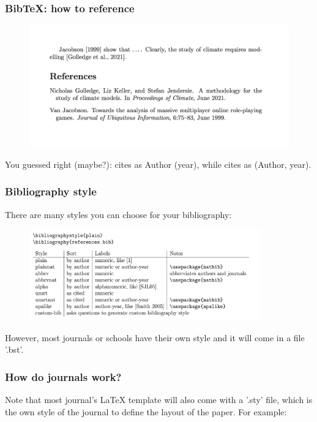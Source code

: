 \documentclass{beamer}
\def\openesc{\color{blue}}
\def\closeesc{\color{black}}
\def\vbdelim{\catcode`<=\active\catcode`>=\active%
\def<{\openesc}
\def>{\closeesc}}
\begin{document}
\begin{frame}[fragile]
\frametitle{BibTeX: how to reference}
\begin{figure}
\includegraphics[width=120mm]{figures/Citing.png}
\end{figure}
You guessed right (maybe?): \color{blue}{\verb|\citet|} \color{black}{} cites as Author (year), while \color{blue}{\verb|\citep|} \color{black}{} cites as (Author, year).
\end{frame}



\begin{frame}[fragile]
\frametitle{Bibliography style}
There are many styles you can choose for your bibliography:
\begin{figure}
\includegraphics[width=100mm]{figures/bibliostyle.png}
\end{figure}
However, most journals or schools have their own style and it will come in a file '.bst'. 
\end{frame}

\begin{frame}[fragile]
\frametitle{How do journals work?}
Note that most journal's \LaTeX{} template will also come with a '.sty' file, which is the own style of the journal to define the layout of the paper. For example:
\end{frame}
\end{document}
